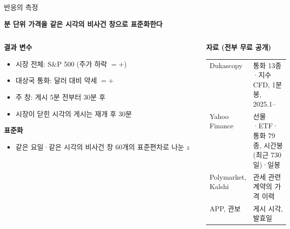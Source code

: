 \documentclass[aspectratio=169,9pt,t]{beamer}
\newcommand{\msg}[1]{{\fontsize{11.5}{15}\selectfont\bfseries\color{navy}\RaggedRight #1\par}\vspace{2.0mm}}
\newcommand{\lab}[1]{{\fontsize{8.4}{10.5}\selectfont\bfseries\color{crim}#1}}
\renewcommand{\arraystretch}{1.3}
\newcommand{\tfs}{\fontsize{7.5}{9.4}\selectfont\renewcommand{\arraystretch}{1.18}}
\begin{document}
\begin{frame}{반응의 측정}
\msg{분 단위 가격을 같은 시각의 비사건 창으로 표준화한다}
\begin{columns}[T,onlytextwidth]
\begin{column}{0.48\textwidth}
\lab{결과 변수}
\begin{itemize}
\item 시장 전체: S\&P 500 (주가 하락 $=+$)
\item 대상국 통화: 달러 대비 약세 $=+$
\item 주 창: 게시 5분 전부터 30분 후
\item 시장이 닫힌 시각의 게시는 재개 후 30분
\end{itemize}
\vspace{1mm}
\lab{표준화}
\begin{itemize}
\item 같은 요일·같은 시각의 비사건 창 60개의 표준편차로 나눈 $z$
\end{itemize}
\end{column}
\begin{column}{0.48\textwidth}
\lab{자료 (전부 무료 공개)}\par\vspace{1mm}
\begingroup\tfs
\begin{tabularx}{\linewidth}{@{}L{0.36\linewidth}Y@{}}
\toprule
Dukascopy & 통화 13종·지수 CFD, 1분봉, 2025.1--\\
Yahoo Finance & 선물·ETF·통화 79종, 시간봉(최근 730일)·일봉\\
Polymarket, Kalshi & 관세 관련 계약의 가격 이력\\
APP, 관보 & 게시 시각, 발효일\\
\bottomrule
\end{tabularx}\endgroup
\end{column}
\end{columns}
\end{frame}
\end{document}
